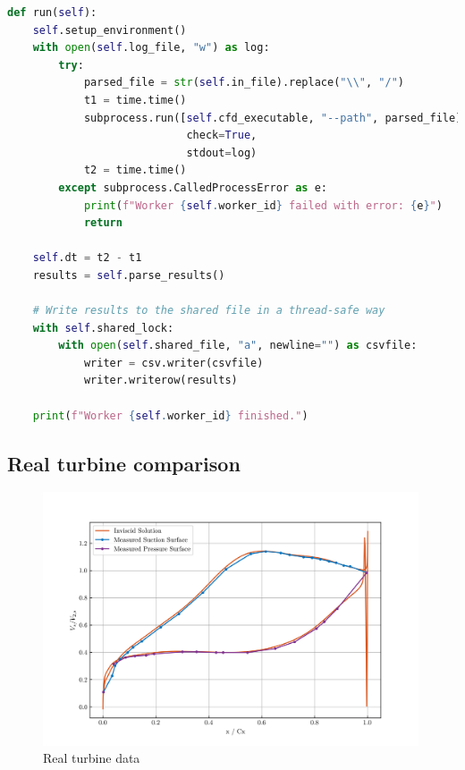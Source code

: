 \documentclass{article}
\begin{document}
\begin{lstlisting}[language=Python]
def run(self):
    self.setup_environment()
    with open(self.log_file, "w") as log:
        try:
            parsed_file = str(self.in_file).replace("\\", "/")
            t1 = time.time()
            subprocess.run([self.cfd_executable, "--path", parsed_file],
                            check=True,
                            stdout=log)
            t2 = time.time()
        except subprocess.CalledProcessError as e:
            print(f"Worker {self.worker_id} failed with error: {e}")
            return

    self.dt = t2 - t1
    results = self.parse_results()

    # Write results to the shared file in a thread-safe way
    with self.shared_lock:
        with open(self.shared_file, "a", newline="") as csvfile:
            writer = csv.writer(csvfile)
            writer.writerow(results)

    print(f"Worker {self.worker_id} finished.")
\end{lstlisting}

\subsection{Real turbine comparison}

\begin{figure}[H]
    \centering
    \includegraphics[width=0.99\textwidth]{figures/turbine_real.png}
    \caption{Real turbine data \cite{4A3_lab}}
    \label{fig:turbine_real}
\end{figure}
\end{document}
